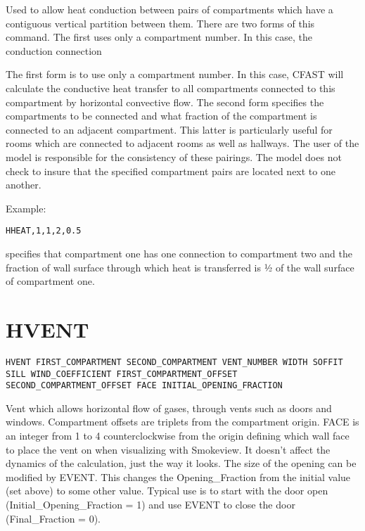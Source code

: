 Used to allow heat conduction between pairs of compartments which have a contiguous vertical partition between them.  There are two forms of this command. The first uses only a compartment number. In this case, the conduction connection

The first form is to use only a compartment number. In this case, CFAST will calculate the conductive heat transfer to all compartments connected to this compartment by horizontal convective flow. The second form specifies the compartments to be connected and what fraction of the compartment is connected to an adjacent compartment. This latter is particularly useful for rooms which are connected to adjacent rooms as well as hallways. The user of the model is responsible for the consistency of these pairings.  The model does not check to insure that the specified compartment pairs are located next to one another.

Example:

\begin{lstlisting}
HHEAT,1,1,2,0.5
\end{lstlisting}

specifies that compartment one has one connection to compartment two and the fraction of wall surface through which heat is transferred is ½ of the wall surface of compartment one.

\section{HVENT}

\begin{lstlisting}
HVENT FIRST_COMPARTMENT SECOND_COMPARTMENT VENT_NUMBER WIDTH SOFFIT SILL WIND_COEFFICIENT FIRST_COMPARTMENT_OFFSET SECOND_COMPARTMENT_OFFSET FACE INITIAL_OPENING_FRACTION
\end{lstlisting}

Vent which allows horizontal flow of gases, through vents such as doors and windows. Compartment offsets are triplets from the compartment origin.  FACE is an integer from 1 to 4 counterclockwise from the origin defining which wall face to place the vent on when visualizing with Smokeview. It doesn't affect the dynamics of the calculation, just the way it looks. The size of the opening can be modified by EVENT. This changes the Opening\_Fraction from the initial value (set above) to some other value. Typical use is to start with the door open (Initial\_Opening\_Fraction = 1) and use EVENT to close the door (Final\_Fraction = 0).

